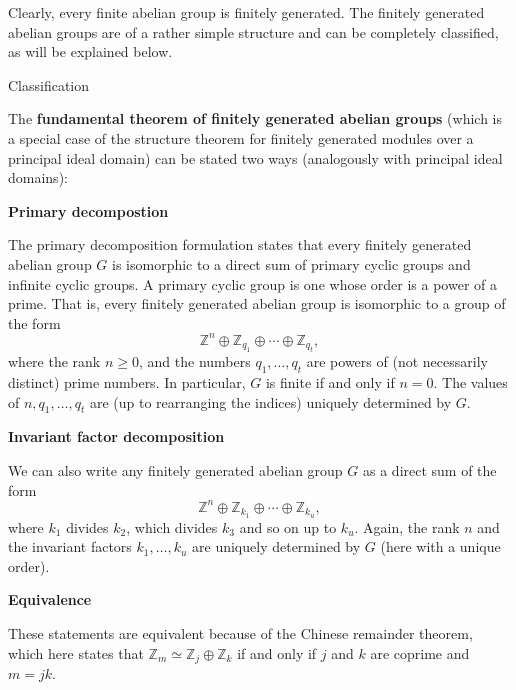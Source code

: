 \documentclass{ctexart}
\begin{document}
\begin{enumerate}
Clearly, every finite abelian group is finitely generated. The finitely generated abelian groups are of a rather simple structure and can be completely classified, as will be explained below.

Classification

The \textbf{fundamental theorem of finitely generated abelian groups} (which is a special case of the structure theorem for finitely generated modules over a principal ideal domain) can be stated two ways (analogously with principal ideal domains):

\textbf{Primary decompostion}

The primary decomposition formulation states that every finitely generated abelian group $G$ is isomorphic to a direct sum of primary cyclic groups and infinite cyclic groups. A primary cyclic group is one whose order is a power of a prime. That is, every finitely generated abelian group is isomorphic to a group of the form
\[
\mathbb {Z} ^{n}\oplus \mathbb {Z} _{q_{1}}\oplus \cdots \oplus \mathbb {Z} _{q_{t}},
\]
where the rank $n \geq 0$, and the numbers $q_1,\ldots, q_t$ are powers of (not necessarily distinct) prime numbers. In particular, $G$ is finite if and only if $n = 0$. The values of $n, q_1,\ldots, q_t$ are (up to rearranging the indices) uniquely determined by $G$.

\textbf{Invariant factor decomposition}

We can also write any finitely generated abelian group $G$ as a direct sum of the form
\[
\mathbb {Z} ^{n}\oplus \mathbb {Z} _{k_{1}}\oplus \cdots \oplus \mathbb {Z} _{k_{u}},
\]
where $k_1$ divides $k_2$, which divides $k_3$ and so on up to $k_u$. Again, the rank $n$ and the invariant factors $k_1,\ldots, k_u$ are uniquely determined by $G$ (here with a unique order).

\textbf{Equivalence}

These statements are equivalent because of the Chinese remainder theorem, which here states that $\mathbb {Z} _{m}\simeq \mathbb {Z} _{j}\oplus \mathbb {Z} _{k}$ if and only if $j$ and $k$ are coprime and $m = jk$.
\end{enumerate}
\newpage
\printbibliography
\end{document}
